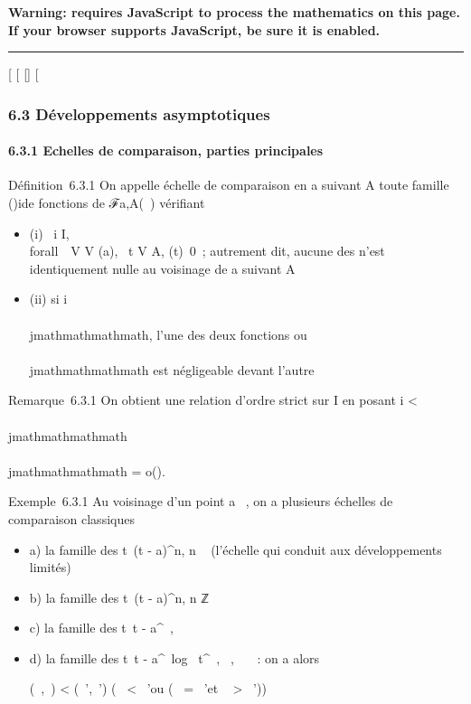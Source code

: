 \textbf{Warning: 
requires JavaScript to process the mathematics on this page.\\ If your
browser supports JavaScript, be sure it is enabled.}

\begin{center}\rule{3in}{0.4pt}\end{center}

{[}
{[}
{[}{]}
{[}

\subsubsection{6.3 Développements asymptotiques}

\paragraph{6.3.1 Echelles de comparaison, parties principales}

Définition~6.3.1 On appelle échelle de comparaison en a suivant A toute
famille (\phii)i\inI de fonctions de ℱa,A(~)
vérifiant

\begin{itemize}
\itemsep1pt\parskip0pt
\item
  (i) \forall~i \in I, \\forall~~V \in V
  (a), \exists~t \in V \bigcap A,
  \phii(t)\neq~0~; autrement dit, aucune
  des \phii n'est identiquement nulle au voisinage de a suivant A
\item
  (ii) si i\neq~\\\\jmathmathmathmath, l'une des deux fonctions
  \phii ou \phi\\\\jmathmathmathmath est négligeable devant l'autre
\end{itemize}

Remarque~6.3.1 On obtient une relation d'ordre strict sur I en posant i
\textless{} \\\\jmathmathmathmath \Leftrightarrow \phi\\\\jmathmathmathmath =
o(\phii).

Exemple~6.3.1 Au voisinage d'un point a \in {}~, on a plusieurs échelles de
comparaison classiques

\begin{itemize}
\item
  a) la famille des t\mapsto~(t - a)^n, n
  \in {}~ (l'échelle qui conduit aux développements limités)
\item
  b) la famille des t\mapsto~(t - a)^n, n
  \in ℤ
\item
  c) la famille des t\mapsto~\textbar{}t -
  a\textbar{}^\alpha~, \alpha~ \in {}~
\item
  d) la famille des t\mapsto~\textbar{}t -
  a\textbar{}^\alpha~\textbar{}log~
  t\textbar{}^\beta~, \alpha~,\beta~ \in {}~~: on a alors

  (\alpha~,\beta~) \textless{} (\alpha~',\beta~') \Leftrightarrow
  \bigl (\alpha~ \textless{} \alpha~'\text ou (\alpha~
  = \alpha~'\text et \beta~ \textgreater{}
  \beta~')\bigr )
\end{itemize}

